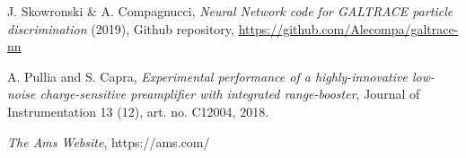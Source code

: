 \begin{thebibliography}{20}
  J. Skowronski \& A. Compagnucci,
  \emph{Neural Network code for GALTRACE particle discrimination} (2019), Github repository, \url{https://github.com/Alecompa/galtrace-nn}

  A. Pullia and S. Capra,
  \emph{Experimental performance of a highly-innovative low-noise charge-sensitive preamplifier with integrated range-booster}, Journal of Instrumentation 13 (12), art. no. C12004, 2018.

  \emph{The Ams Website}, https://ams.com/

\end{thebibliography}
